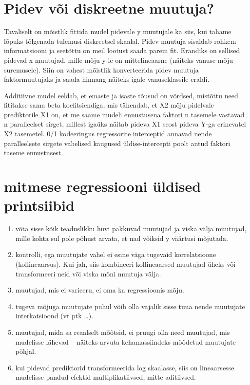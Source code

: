 \documentclass[]{book}
\begin{document}
\section{Pidev või diskreetne
muutuja?}\label{pidev-voi-diskreetne-muutuja}

Tavaliselt on mõistlik fittida mudel pidevale y muutujale ka siis, kui
tahame lõpuks tõlgenada tulemusi diskreetsel skaalal. Pidev muutuja
sisaldab rohkem informatsiooni ja seetõttu on meil lootust saada parem
fit. Erandiks on sellised pidevad x muutujad, mille mõju y-le on
mittelineaarne (näiteks vanuse mõju suremusele). Siin on vahest mõistlik
konverteerida pidev muutuja faktormuutujaks ja saada hinnang näiteks
igale vanuseklassile eraldi.

Additiivne mudel eeldab, et emaste ja isaste tõusud on võrdsed, mistõttu
need fititakse sama beta koefitsiendiga, mis tähendab, et X2 mõju
pidelvale prediktorile X1 on, et me saame mudeli ennustusena faktori n
tasemele vastavad n paralleelset sirget, millest igaüks näitab pideva X1
seost pideva Y-ga erinevatel X2 tasemetel. 0/1 kodeeringus regressorite
interceptid annavad nende paralleelsete sirgete vahelised kaugused
üldise-intercepti poolt antud faktori taseme ennustusest.

\section{mitmese regressiooni üldised
printsiibid}\label{mitmese-regressiooni-uldised-printsiibid}

\begin{enumerate}
\def\labelenumi{\arabic{enumi}.}
\item
  võta sisse kõik teaduslikku huvi pakkuvad muutujad ja viska välja
  muutujad, mille kohta sul pole põhust arvata, et nad võiksid y
  väärtusi mõjutada.
\item
  kontrolli, ega muutujate vahel ei esine väga tugevaid korrelatsioone
  (kollineaarsus). Kui jah, siis kombineeri kollineaarsed muutujad üheks
  või transformeeri neid või viska mõni muutuja välja.
\item
  muutujad, mis ei varieeru, ei oma ka regressioonis mõju.
\item
  tugeva mõjuga muutujate puhul võib olla vajalik sisse tuua nende
  muutujate interkatsioond (vt ptk \ldots{}).
\item
  muutujad, mida sa reaalselt mõõtsid, ei pruugi olla need muutujad, mis
  mudelisse lähevad -- näiteks arvuta kehamassiindeks mõõdetud muutujate
  põhjal.
\item
  kui pidevad prediktorid transformeerida log skaalasse, siis on
  lineaarsesse mudelisse pandud efektid multiplikatiivsed, mitte
  aditiivsed.
\end{enumerate}
\end{document}
